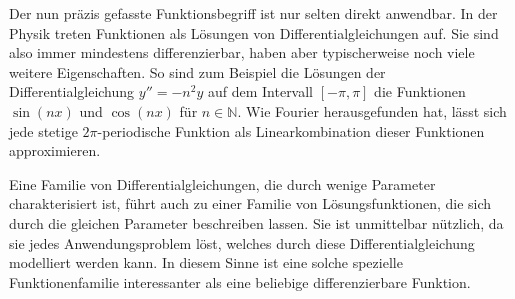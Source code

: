 Der nun präzis gefasste Funktionsbegriff ist nur selten direkt anwendbar.
In der Physik treten Funktionen als Lösungen von Differentialgleichungen
auf. 
Sie sind also immer mindestens differenzierbar, haben aber typischerweise
noch viele weitere Eigenschaften.
So sind zum Beispiel die Lösungen der Differentialgleichung
$y''=-n^2 y$ auf dem Intervall $[-\pi,\pi]$ die Funktionen
$\sin(nx)$ und $\cos(nx)$ für $n\in\mathbb{N}$.
Wie Fourier herausgefunden hat, lässt sich jede stetige $2\pi$-periodische 
Funktion als Linearkombination dieser Funktionen approximieren.

Eine Familie von Differentialgleichungen, die durch wenige Parameter
charakterisiert ist, führt auch zu einer Familie von Lösungsfunktionen, die
sich durch die gleichen Parameter beschreiben lassen.
Sie ist unmittelbar nützlich, da sie jedes Anwendungsproblem löst,
welches durch diese Differentialgleichung modelliert werden kann.
In diesem Sinne ist eine solche spezielle Funktionenfamilie interessanter
als eine beliebige differenzierbare Funktion.

